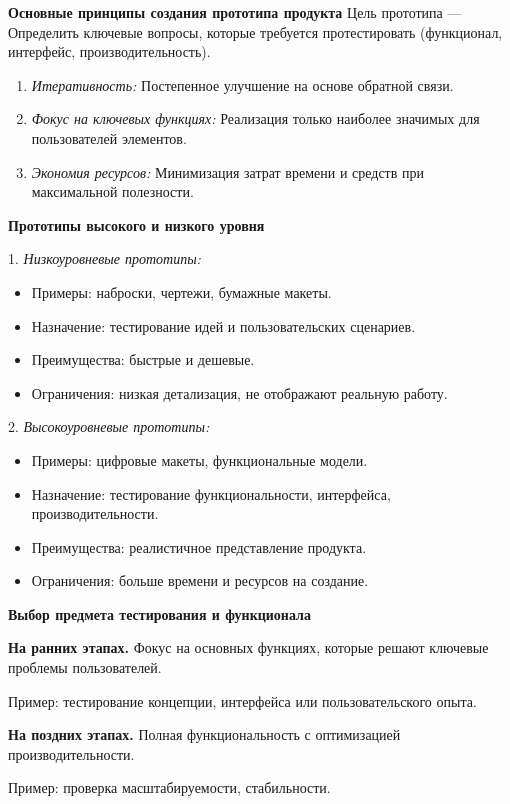 \textbf{Основные принципы создания прототипа продукта}
Цель прототипа --- Определить ключевые вопросы, которые требуется протестировать (функционал, интерфейс, производительность).
\begin{enumerate}
    \item \textit{Итеративность:} Постепенное улучшение на основе обратной связи.
    \item \textit{Фокус на ключевых функциях:} Реализация только наиболее значимых для пользователей элементов.
    \item \textit{Экономия ресурсов:} Минимизация затрат времени и средств при максимальной полезности.
\end{enumerate}

\textbf{Прототипы высокого и низкого уровня}

1. \textit{Низкоуровневые прототипы:}
\begin{itemize}
    \item Примеры: наброски, чертежи, бумажные макеты.
    \item Назначение: тестирование идей и пользовательских сценариев.
    \item Преимущества: быстрые и дешевые.
    \item Ограничения: низкая детализация, не отображают реальную работу.
\end{itemize}

2. \textit{Высокоуровневые прототипы:}
\begin{itemize}
    \item Примеры: цифровые макеты, функциональные модели.
    \item Назначение: тестирование функциональности, интерфейса, производительности.
    \item Преимущества: реалистичное представление продукта.
    \item Ограничения: больше времени и ресурсов на создание.
\end{itemize}

\textbf{Выбор предмета тестирования и функционала}

\textbf{На ранних этапах.} Фокус на основных функциях, которые решают ключевые проблемы пользователей.

Пример: тестирование концепции, интерфейса или пользовательского опыта.

\textbf{На поздних этапах.} Полная функциональность с оптимизацией производительности.

Пример: проверка масштабируемости, стабильности.


